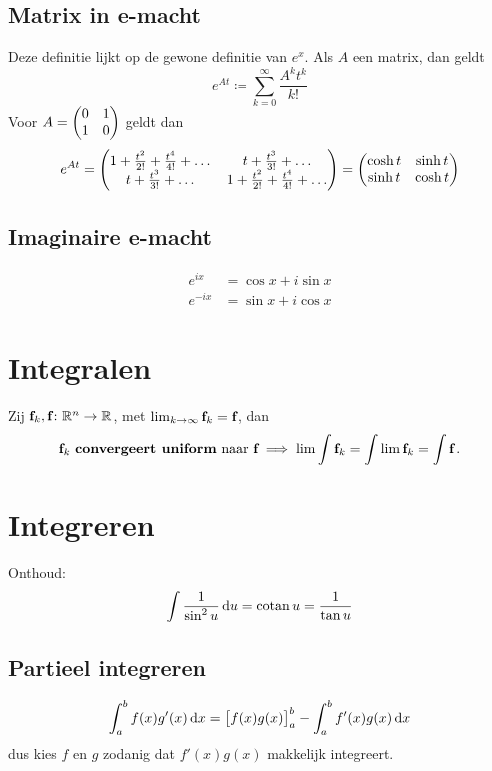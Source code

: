 \documentclass{article}
\begin{document}
	\subsection{Matrix in e-macht}
		Deze definitie lijkt op de gewone definitie van $e^x$. Als $A$ een matrix, dan geldt
		\[ e^{At} \coloneqq \sum_{k=0}^\infty \frac{A^k t^k}{k!} \]
		Voor $\displaystyle A = \begin{pmatrix} 0 & 1 \\ 1 & 0 \end{pmatrix}$ geldt dan
		\[ e^{At} =
		\begin{pmatrix} 1 + \frac{t^2}{2!} + \frac{t^4}{4!} + \dots & t + \frac{t^3}{3!} + \dots \\
			t + \frac{t^3}{3!} + \dots & 1 + \frac{t^2}{2!} + \frac{t^4}{4!} + \dots \end{pmatrix}
		= \begin{pmatrix} \cosh t & \sinh t \\ \sinh t & \cosh t \end{pmatrix}\]

	\subsection{Imaginaire e-macht}

	\begin{align*}
		e^{ix} &= \cos x + i \sin x \\
		e^{-ix} &= \sin x + i \cos x
	\end{align*}
 		
 	\section{Integralen}
	 	\begin{stelling}
		 	Zij ${\textbf{f}}_k,{\textbf{f}} \colon \mathbb{R}^n \to \mathbb{R}$, met $\lim_{k \to \infty} {\textbf{f}}_k = {\textbf{f}}$, dan
		 	\[ {\textbf{f}}_k \text { \textbf{convergeert uniform} naar } {\textbf{f}} \implies \lim \int {\textbf{f}}_k = \int \lim {\textbf{f}}_k = \int {\textbf{f}} \,. \]
	 	\end{stelling}
	 	
	\section{Integreren}
        Onthoud:
        \begin{align*}
            \int \frac{1}{\sin^2 u} \mathop{}\!\mathrm{d} u = \operatorname{\mathop{cotan}} u = \frac{1}{\tan u}
        \end{align*}
        \subsection{Partieel integreren}
            \[
                \int_a^b f(x) g'(x) \mathop{}\!\mathrm{d} x = \big[f(x)g(x)\big]_a^b - \int_a^b f'(x) g(x) \mathop{}\!\mathrm{d} x
             \]
             dus kies $f$ en $g$ zodanig dat $f'(x)g(x)$ makkelijk integreert.
\end{document}
